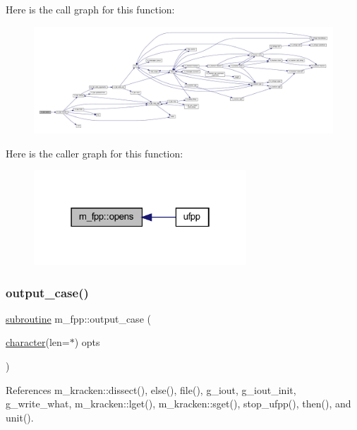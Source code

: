 Here is the call graph for this function\+:
\nopagebreak
\begin{figure}[H]
\begin{center}
\leavevmode
\includegraphics[width=350pt]{namespacem__fpp_a74802eb09b223cb8856d01e9247ff46e_cgraph}
\end{center}
\end{figure}
Here is the caller graph for this function\+:
\nopagebreak
\begin{figure}[H]
\begin{center}
\leavevmode
\includegraphics[width=226pt]{namespacem__fpp_a74802eb09b223cb8856d01e9247ff46e_icgraph}
\end{center}
\end{figure}
\mbox{\label{namespacem__fpp_aeab3b5145d977b953ea972b2882e442a}} 
\subsubsection{\texorpdfstring{output\+\_\+case()}{output\_case()}}
{\footnotesize\ttfamily \hyperlink{M__stopwatch_83_8txt_acfbcff50169d691ff02d4a123ed70482}{subroutine} m\+\_\+fpp\+::output\+\_\+case (\begin{DoxyParamCaption}\item[{\hyperlink{option__stopwatch_83_8txt_abd4b21fbbd175834027b5224bfe97e66}{character}(len=$\ast$)}]{opts }\end{DoxyParamCaption})}



References m\+\_\+kracken\+::dissect(), else(), file(), g\+\_\+iout, g\+\_\+iout\+\_\+init, g\+\_\+write\+\_\+what, m\+\_\+kracken\+::lget(), m\+\_\+kracken\+::sget(), stop\+\_\+ufpp(), then(), and unit().

